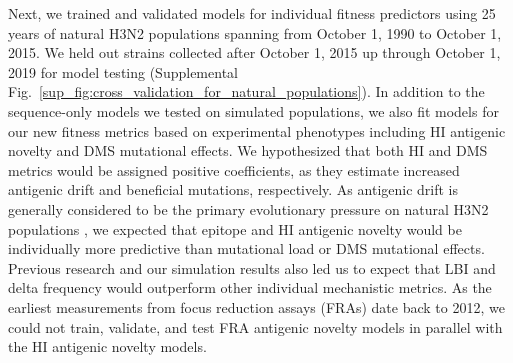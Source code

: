 Next, we trained and validated models for individual fitness predictors using 25 years of natural H3N2 populations spanning from October 1, 1990 to October 1, 2015.
We held out strains collected after October 1, 2015 up through October 1, 2019 for model testing (Supplemental Fig.~\ref{sup_fig:cross_validation_for_natural_populations}).
In addition to the sequence-only models we tested on simulated populations, we also fit models for our new fitness metrics based on experimental phenotypes including HI antigenic novelty and DMS mutational effects.
We hypothesized that both HI and DMS metrics would be assigned positive coefficients, as they estimate increased antigenic drift and beneficial mutations, respectively.
As antigenic drift is generally considered to be the primary evolutionary pressure on natural H3N2 populations \cite{Smith:2004jc,Bedford:2014bf,Luksza:2014hj}, we expected that epitope and HI antigenic novelty would be individually more predictive than mutational load or DMS mutational effects.
Previous research \cite{Neher:2014eu} and our simulation results also led us to expect that LBI and delta frequency would outperform other individual mechanistic metrics.
As the earliest measurements from focus reduction assays (FRAs) date back to 2012, we could not train, validate, and test FRA antigenic novelty models in parallel with the HI antigenic novelty models.

